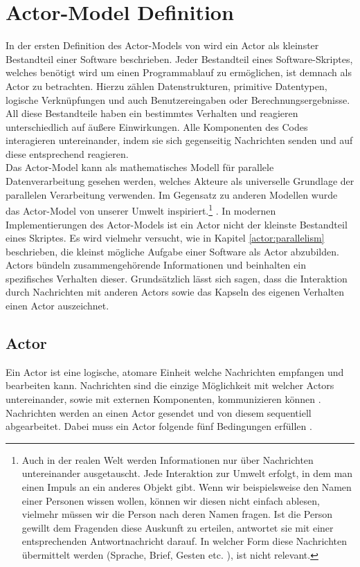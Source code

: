 \section{Actor-Model Definition}\label{actor:definition}
In der ersten Definition des Actor-Models von \cite{hewitt1973session} wird ein Actor als kleinster Bestandteil einer Software beschrieben. Jeder Bestandteil eines Software-Skriptes, welches benötigt wird um einen Programmablauf zu ermöglichen, ist demnach als Actor zu betrachten. Hierzu zählen Datenstrukturen, primitive Datentypen, logische Verknüpfungen und auch Benutzereingaben oder Berechnungsergebnisse. All diese Bestandteile haben ein bestimmtes Verhalten und reagieren unterschiedlich auf äußere Einwirkungen. Alle Komponenten des Codes interagieren untereinander, indem sie sich gegenseitig Nachrichten senden und auf diese entsprechend reagieren.\\
Das Actor-Model kann als mathematisches Modell für parallele Datenverarbeitung gesehen werden, welches Akteure als universelle Grundlage der parallelen Verarbeitung verwenden. Im Gegensatz zu anderen Modellen wurde das Actor-Model von unserer Umwelt inspiriert.\footnote{Auch in der realen Welt werden Informationen nur über Nachrichten untereinander ausgetauscht. Jede Interaktion zur Umwelt erfolgt, in dem man einen Impuls an ein anderes Objekt gibt. Wenn wir beispielsweise den Namen einer Personen wissen wollen, können wir diesen nicht einfach ablesen, vielmehr müssen wir die Person nach deren Namen fragen. Ist die Person gewillt dem Fragenden diese Auskunft zu erteilen, antwortet sie mit einer entsprechenden Antwortnachricht darauf. In welcher Form diese Nachrichten übermittelt werden (Sprache, Brief, Gesten etc. ), ist nicht relevant.} \citep{Vernon2015ReactiveAkka} . In modernen Implementierungen des Actor-Models ist ein Actor nicht der kleinste Bestandteil eines Skriptes. Es wird vielmehr versucht, wie in Kapitel \ref{actor:parallelism} beschrieben, die kleinst mögliche Aufgabe einer Software als Actor abzubilden. \\
Actors bündeln zusammengehörende Informationen und beinhalten ein spezifisches Verhalten dieser. Grundsätzlich lässt sich sagen, dass die Interaktion durch Nachrichten mit anderen Actors sowie das Kapseln des eigenen Verhalten einen Actor auszeichnet.

\subsection{Actor}
Ein Actor ist eine logische, atomare Einheit welche Nachrichten empfangen und bearbeiten kann. Nachrichten sind die einzige Möglichkeit mit welcher Actors untereinander, sowie mit externen Komponenten, kommunizieren können \citep{Agha1985ConcurrentParallelism}. Nachrichten werden an einen Actor gesendet und von diesem sequentiell abgearbeitet. Dabei muss ein Actor folgende fünf Bedingungen erfüllen \citep{Agha1985ConcurrentParallelism}.

